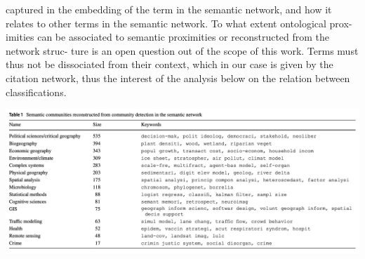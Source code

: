 {captured in the embedding of the term in the semantic network, and how it relates to other terms in the semantic network. To what extent ontological prox- imities can be associated to semantic proximities or reconstructed from the network struc- ture is an open question out of the scope of this work. Terms must thus not be dissociated from their context, which in our case is given by the citation network, thus the interest of the analysis below on the relation between classifications.

\centering

\includegraphics[width=\linewidth]{figures/Tab1.png}

}



